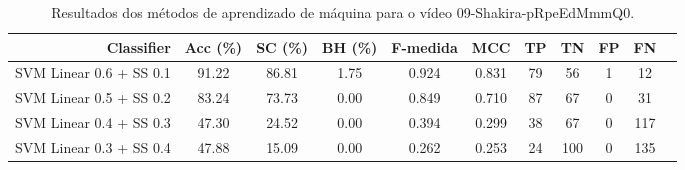 \begin{table}[!htb]
\centering
\caption{Resultados dos métodos de aprendizado de máquina para o vídeo 09-Shakira-pRpeEdMmmQ0.}
\label{tab:09-Shakira-pRpeEdMmmQ0}
\begin{tabular}{r|c|c|c|c|c|c|c|c|c|c}
\hline\hline
Classifier & Acc (\%) & SC (\%) & BH (\%) & F-medida & MCC & TP & TN & FP & FN \\ \hline
SVM Linear 0.6 + SS 0.1 & 91.22 & 86.81 & 1.75 & 0.924 & 0.831 & 79 & 56 & 1 & 12 \\ 
SVM Linear 0.5 + SS 0.2 & 83.24 & 73.73 & 0.00 & 0.849 & 0.710 & 87 & 67 & 0 & 31 \\ 
SVM Linear 0.4 + SS 0.3 & 47.30 & 24.52 & 0.00 & 0.394 & 0.299 & 38 & 67 & 0 & 117 \\ 
SVM Linear 0.3 + SS 0.4 & 47.88 & 15.09 & 0.00 & 0.262 & 0.253 & 24 & 100 & 0 & 135 \\ 
\hline\hline
\end{tabular}
\end{table}

